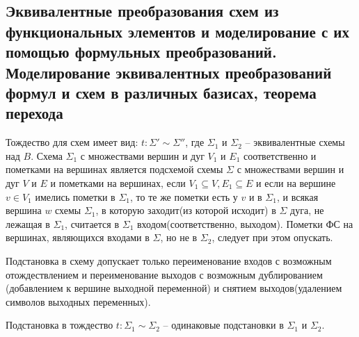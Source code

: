 \documentclass[11pt]{article}
\begin{document}
\subsection{Эквивалентные преобразования схем из функциональных элементов и моделирование с их помощью формульных преобразований. Моделирование эквивалентных преобразований формул и схем в различных базисах, теорема перехода}
\label{sec:org0903a1f}
Тождество для схем имеет вид: \(t: \Sigma' \sim \Sigma''\), где \(\Sigma_1\) и \(\Sigma_2\) --
эквивалентные схемы над \(B\). Схема \(\Sigma_1\) с множествами вершин и дуг \(V_1\) и \(E_1\)
соответственно и пометками на вершинах является подсхемой схемы \(\Sigma\) с множествами вершин
и дуг \(V\) и \(E\) и пометками на вершинах, если \(V_1 \subseteq V, E_1 \subseteq E\) и если на
вершине \(v \in V_1\) имелись пометки в \(\Sigma_1\), то те же пометки есть у \(v\) и в \(\Sigma_1\),
и всякая вершина \(w\) схемы \(\Sigma_1\), в которую заходит(из которой исходит) в \(\Sigma\) дуга,
не лежащая в \(\Sigma_1\), считается в \(\Sigma_1\) входом(соответственно, выходом). Пометки ФС на
вершинах, являющихся входами в \(\Sigma\), но не в \(\Sigma_2\), следует при этом опускать.

Подстановка в схему допускает только переименование входов с возможным отождествлением и
переименование выходов с возможным дублированием (добавлением к вершине выходной переменной)
и снятием выходов(удалением символов выходных переменных).

Подстановка в тождество \(t: \Sigma_1 \sim \Sigma_2\) -- одинаковые подстановки в \(\Sigma_1\) и
\(\Sigma_2\).
\end{document}
